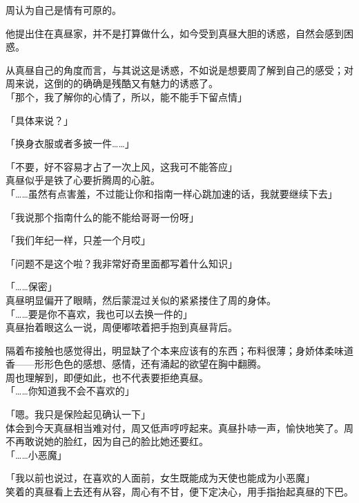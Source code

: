 周认为自己是情有可原的。

他提出住在真昼家，并不是打算做什么，如今受到真昼大胆的诱惑，自然会感到困惑。

从真昼自己的角度而言，与其说这是诱惑，不如说是想要周了解到自己的感受；对周来说，这倒的的确确是残酷又有魅力的诱惑了。\\

「那个，我了解你的心情了，所以，能不能手下留点情」

「具体来说？」

「换身衣服或者多披一件……」

「不要，好不容易才占了一次上风，这我可不能答应」\\

真昼似乎是铁了心要折腾周的心脏。\\

「……虽然有点害羞，不过能让你和指南一样心跳加速的话，我就要继续下去」

「我说那个指南什么的能不能给哥哥一份呀」

「我们年纪一样，只差一个月哎」

「问题不是这个啦？我非常好奇里面都写着什么知识」

「……保密」\\

真昼明显偏开了眼睛，然后蒙混过关似的紧紧搂住了周的身体。\\

「……要是你不喜欢，我也可以去换一件的」\\

真昼抬着眼这么一说，周便嘟哝着把手抱到真昼背后。

隔着布接触也感觉得出，明显缺了个本来应该有的东西；布料很薄；身娇体柔味道香——形形色色的感想、感情，还有涌起的欲望在胸中翻腾。\\

周也理解到，即便如此，也不代表要拒绝真昼。\\

「……你知道我不会不喜欢的」

「嗯。我只是保险起见确认一下」\\

体会到今天真昼相当难对付，周又低声哼哼起来。真昼扑哧一声，愉快地笑了。周不再敢说她的脸红，因为自己的脸比她还要红。\\

「……小恶魔」

「我以前也说过，在喜欢的人面前，女生既能成为天使也能成为小恶魔」\\

笑着的真昼看上去还有从容，周心有不甘，便下定决心，用手指抬起真昼的下巴。

